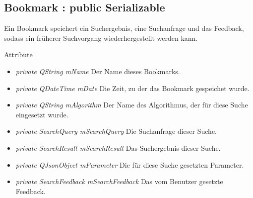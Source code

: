\subsection*{Bookmark : public Serializable}
Ein Bookmark speichert ein Suchergebnis, eine Suchanfrage und das Feedback, sodass ein früherer Suchvorgang wiederhergestellt werden kann.

Attribute
\begin{itemize}
\item\textit{private QString mName} Der Name dieses Bookmarks.
\item\textit{private QDateTime mDate} Die Zeit, zu der das Bookmark gespeichet wurde.
\item\textit{private QString mAlgorithm} Der Name des Algorithmus, der für diese Suche eingesetzt wurde.
\item\textit{private SearchQuery mSearchQuery} Die Suchanfrage dieser Suche.
\item\textit{private SearchResult mSearchResult} Das Suchergebnis dieser Suche.
\item\textit{private QJsonObject mParameter} Die für diese Suche gesetzten Parameter.
\item\textit{private SearchFeedback mSearchFeedback} Das vom Benutzer gesetzte Feedback.
\end{itemize}


